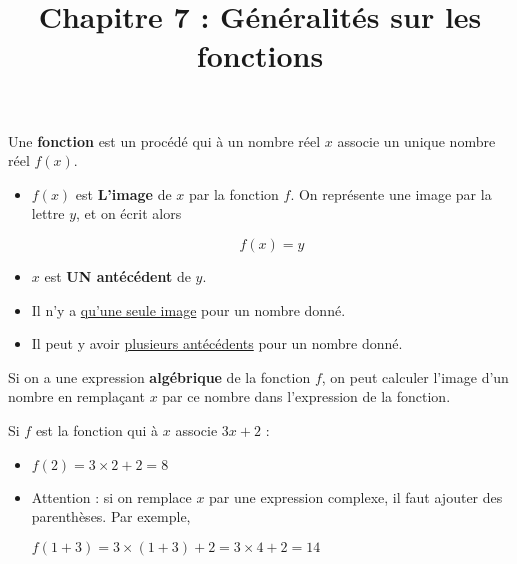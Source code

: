 \documentclass[
	classe=$2^{de}$,
	headerTitle=Cours\space Chapitre\space 7
]{coursclass}
\title{Chapitre 7 : Généralités sur les fonctions}
\date{}
\author{}
\begin{document}
\maketitle

\begin{definition}
	Une \textbf{fonction} est un procédé qui à un nombre réel $x$ associe un unique nombre réel $f(x)$.

	\begin{minipage}{0.65\textwidth}
		\begin{itemize}
			\item $f(x)$ est \textbf{L'image} de $x$ par la fonction $f$. On représente une image par la lettre $y$, et on écrit alors

			      $$ f(x) = y $$
			\item $x$ est \textbf{UN antécédent} de $y$.
		\end{itemize}
	\end{minipage}
	\begin{minipage}{0.3\textwidth}
		\hspace{2em}
	\end{minipage}
\end{definition}

\begin{remarque}
	\begin{itemize}
		\item Il n'y a \uline{qu'une seule image} pour un nombre donné.
		\item Il peut y avoir \uline{plusieurs antécédents} pour un nombre donné.
	\end{itemize}
\end{remarque}

\begin{definition}
	Si on a une expression \textbf{algébrique} de la fonction $f$, on peut calculer l'image d'un nombre en remplaçant $x$ par ce nombre dans l'expression de la fonction.
\end{definition}

\begin{exemple}
	Si $f$ est la fonction qui à $x$ associe $3x + 2$ :
	\begin{itemize}
		\item $f(2) = 3×2 + 2 = 8$
		\item Attention : si on remplace $x$ par une expression complexe, il faut ajouter des parenthèses. Par exemple,

		      $f(1 + 3) = 3×(1 + 3) + 2 = 3×4 + 2 = 14$
	\end{itemize}
\end{exemple}
\end{document}
